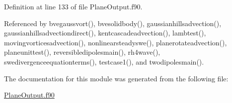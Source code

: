 Definition at line 133 of file Plane\+Output.\+f90.



Referenced by bvegaussvort(), bvesolidbody(), gaussianhillsadvection(), gaussianhillsadvectiondirect(), kentcascadeadvection(), lambtest(), movingvorticesadvection(), nonlinearsteadyswe(), planerotateadvection(), planeunittest(), reversibledipolesmain(), rh4wave(), swedivergenceequationterms(), testcase1(), and twodipolesmain().



The documentation for this module was generated from the following file\+:\begin{DoxyCompactItemize}
\item 
\hyperlink{PlaneOutput_8f90}{Plane\+Output.\+f90}\end{DoxyCompactItemize}
